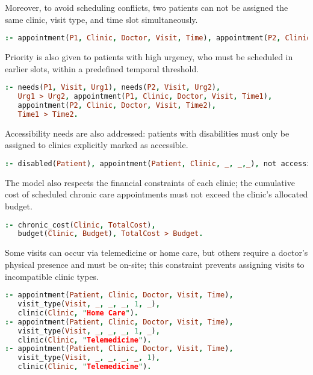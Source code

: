 \documentclass{tlp}
\begin{document}
Moreover, to avoid scheduling conflicts, two patients can not be assigned the same clinic, visit type, and time slot simultaneously.

\begin{lstlisting}[language=Prolog, caption=Constraint Preventing Double Booking of the Same Slot]
:- appointment(P1, Clinic, Doctor, Visit, Time), appointment(P2, Clinic, Doctor, Visit, Time), P1 != P2.
\end{lstlisting}

Priority is also given to patients with high urgency, who must be scheduled in earlier slots, within a predefined temporal threshold.

\begin{lstlisting}[language=Prolog, caption=Constraint to Prioritize Urgent Visits]
:- needs(P1, Visit, Urg1), needs(P2, Visit, Urg2),
   Urg1 > Urg2, appointment(P1, Clinic, Doctor, Visit, Time1),
   appointment(P2, Clinic, Doctor, Visit, Time2),
   Time1 > Time2.
\end{lstlisting}


Accessibility needs are also addressed: patients with disabilities must only be assigned to clinics explicitly marked as accessible.

\begin{lstlisting}[language=Prolog, caption=Constraint Preventing Assignment to Inaccessible Clinics]
:- disabled(Patient), appointment(Patient, Clinic, _, _,_), not accessible(Clinic).
\end{lstlisting}

The model also respects the financial constraints of each clinic; the cumulative cost of scheduled chronic care appointments must not exceed the clinic’s allocated budget.

\begin{lstlisting}[language=Prolog, caption=Constraint to Respect Clinic Budget Limits]
:- chronic_cost(Clinic, TotalCost),
   budget(Clinic, Budget), TotalCost > Budget.
\end{lstlisting}

Some visits can occur via telemedicine or home care, but others require a doctor’s physical presence and must be on-site; this constraint prevents assigning visits to incompatible clinic types.

\begin{lstlisting}[language=Prolog, caption=Constraints for Incompatible Visit Types and Clinic Modes]
:- appointment(Patient, Clinic, Doctor, Visit, Time),
   visit_type(Visit, _, _, _, 1, _),
   clinic(Clinic, "Home Care").
:- appointment(Patient, Clinic, Doctor, Visit, Time),
   visit_type(Visit, _, _, _, 1, _),
   clinic(Clinic, "Telemedicine").
:- appointment(Patient, Clinic, Doctor, Visit, Time),
   visit_type(Visit, _, _, _, _, 1),
   clinic(Clinic, "Telemedicine").
\end{lstlisting}
\end{document}
